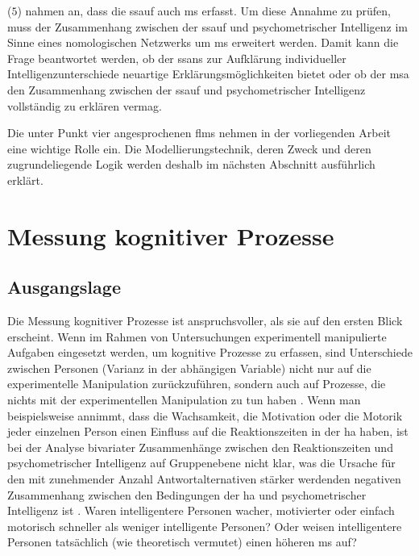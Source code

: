 \documentclass[11pt, twoside, a4paper]{book}		%
\begin{document}
($5$) \citeauthor{Melnick2013} nahmen an, dass die \gls{ssauf} auch \gls{ms} erfasst. Um diese Annahme zu prüfen, muss der Zusammenhang zwischen der \gls{ssauf}
und psychometrischer Intelligenz im Sinne eines nomologischen Netzwerks \citep{Cronbach1955} um \gls{ms} erweitert werden. Damit kann die Frage beantwortet werden, ob der \gls{ssans} zur Aufklärung individueller Intelligenzunterschiede neuartige Erklärungsmöglichkeiten bietet oder ob der \gls{msa} den Zusammenhang zwischen der \gls{ssauf} und psychometrischer Intelligenz vollständig zu erklären vermag.

Die unter Punkt vier angesprochenen \glspl{flm}  nehmen in der vorliegenden Arbeit eine wichtige Rolle ein.
Die Modellierungstechnik, deren Zweck und deren zugrundeliegende Logik werden deshalb im nächsten Abschnitt ausführlich erklärt.

\section{Messung kognitiver Prozesse \label{sec:Messung_kognitiver_Prozesse}}

\subsection{Ausgangslage}

Die Messung kognitiver Prozesse ist anspruchsvoller, als sie auf den ersten Blick erscheint. Wenn im Rahmen von Untersuchungen experimentell manipulierte Aufgaben eingesetzt werden, um kognitive Prozesse zu erfassen, sind Unterschiede zwischen Personen (Varianz in der abhängigen Variable) nicht nur auf die experimentelle Manipulation zurückzuführen, sondern auch auf Prozesse, die nichts mit der experimentellen Manipulation zu tun haben \citep[]{Jensen1982b, Miller2013, Neubauer1997a, Schweizer2007, Unsworth2007, vanZomeren1994}.%
Wenn man beispielsweise annimmt, dass die Wachsamkeit, die Motivation oder die Motorik jeder einzelnen Person einen Einfluss auf die Reaktionszeiten in der \gls{ha} haben, ist bei der Analyse bivariater Zusammenhänge zwischen den Reaktionszeiten und psychometrischer Intelligenz auf Gruppenebene nicht klar, was die Ursache für den mit zunehmender Anzahl Antwortalternativen stärker werdenden negativen Zusammenhang zwischen den Bedingungen der \gls{ha} und psychometrischer Intelligenz ist \citep{Sheppard2008, Vernon1984}. Waren intelligentere Personen wacher, motivierter oder einfach motorisch schneller als weniger intelligente Personen? Oder weisen intelligentere Personen tatsächlich (wie theoretisch vermutet) einen höheren \gls{ms} auf?
\end{document}
